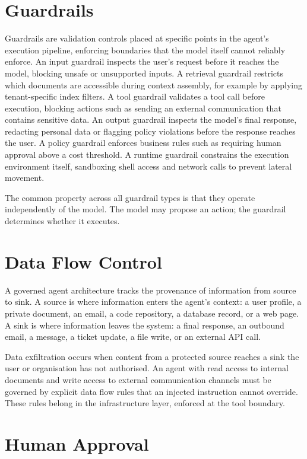 \section{Guardrails}

Guardrails are validation controls placed at specific points in the agent's execution
pipeline, enforcing boundaries that the model itself cannot reliably enforce. An input
guardrail inspects the user's request before it reaches the model, blocking unsafe or
unsupported inputs. A retrieval guardrail restricts which documents are accessible during
context assembly, for example by applying tenant-specific index filters. A tool guardrail
validates a tool call before execution, blocking actions such as sending an external
communication that contains sensitive data. An output guardrail inspects the model's
final response, redacting personal data or flagging policy violations before the response
reaches the user. A policy guardrail enforces business rules such as requiring human
approval above a cost threshold. A runtime guardrail constrains the execution environment
itself, sandboxing shell access and network calls to prevent lateral movement.

The common property across all guardrail types is that they operate independently of the
model. The model may propose an action; the guardrail determines whether it executes.

\section{Data Flow Control}

A governed agent architecture tracks the provenance of information from source to sink.
A source is where information enters the agent's context: a user profile, a private
document, an email, a code repository, a database record, or a web page. A sink is where
information leaves the system: a final response, an outbound email, a message, a ticket
update, a file write, or an external API call.

Data exfiltration occurs when content from a protected source reaches a sink the user or
organisation has not authorised. An agent with read access to internal documents and
write access to external communication channels must be governed by explicit data flow
rules that an injected instruction cannot override. These rules belong in the
infrastructure layer, enforced at the tool boundary.

\section{Human Approval}

